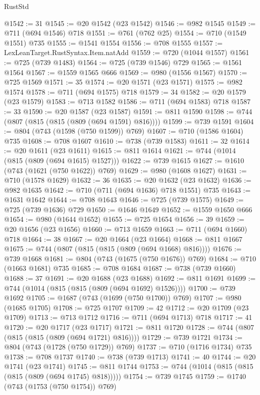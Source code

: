 \begin{lexlean}{RustStd}
\begin{coremodule}
@1542 := 31
@1545 := @20 @1542 (@23 @1542)
@1546 := @982 @1545
@1549 := @711 (@694 @1546) @718
@1551 := @761 (@762 @25)
@1554 := @710 (@1549 @1551) @735
@1555 := @1541 @1554
@1556 := @708 @1555
@1557 := LexLeanTarget.RustSyntax.Item.natAdd
@1559 := @720 (@1044 @1557)
@1561 := @725 (@739 @1483)
@1564 := @725 (@739 @1546) @729
@1565 := @1561 @1564
@1567 := @1559 @1565 @666
@1569 := @980 (@1556 @1567)
@1570 := @725 @1569
@1571 := 35
@1574 := @20 @1571 (@23 @1571)
@1575 := @982 @1574
@1578 := @711 (@694 @1575) @718
@1579 := 34
@1582 := @20 @1579 (@23 @1579)
@1583 := @713 @1582
@1586 := @711 (@694 @1583) @718
@1587 := 33
@1590 := @20 @1587 (@23 @1587)
@1591 := @811 @1590
@1598 := @744 (@807 (@815 (@815 (@809 (@694 @1591) @816))))
@1599 := @739 @1591
@1604 := @804 (@743 (@1598 (@750 @1599)) @769)
@1607 := @710 (@1586 @1604) @735
@1608 := @708 @1607
@1610 := @738 (@739 @1583)
@1611 := 32
@1614 := @20 @1611 (@23 @1611)
@1615 := @811 @1614
@1621 := @744 (@1014 (@815 (@809 (@694 @1615) @1527)))
@1622 := @739 @1615
@1627 := @1610 (@743 (@1621 (@750 @1622)) @769)
@1629 := @980 (@1608 @1627)
@1631 := @710 (@1578 @1629)
@1632 := 36
@1635 := @20 @1632 (@23 @1632)
@1636 := @982 @1635
@1642 := @710 (@711 (@694 @1636) @718 @1551) @735
@1643 := @1631 @1642
@1644 := @708 @1643
@1646 := @725 (@739 @1575)
@1649 := @725 (@739 @1636) @729
@1650 := @1646 @1649
@1652 := @1559 @1650 @666
@1654 := @980 (@1644 @1652)
@1655 := @725 @1654
@1656 := 39
@1659 := @20 @1656 (@23 @1656)
@1660 := @713 @1659
@1663 := @711 (@694 @1660) @718
@1664 := 38
@1667 := @20 @1664 (@23 @1664)
@1668 := @811 @1667
@1675 := @744 (@807 (@815 (@815 (@809 (@694 @1668) @816))))
@1676 := @739 @1668
@1681 := @804 (@743 (@1675 (@750 @1676)) @769)
@1684 := @710 (@1663 @1681) @735
@1685 := @708 @1684
@1687 := @738 (@739 @1660)
@1688 := 37
@1691 := @20 @1688 (@23 @1688)
@1692 := @811 @1691
@1699 := @744 (@1014 (@815 (@815 (@809 (@694 @1692) @1526))))
@1700 := @739 @1692
@1705 := @1687 (@743 (@1699 (@750 @1700)) @769)
@1707 := @980 (@1685 @1705)
@1708 := @725 @1707
@1709 := 42
@1712 := @20 @1709 (@23 @1709)
@1713 := @713 @1712
@1716 := @711 (@694 @1713) @718
@1717 := 41
@1720 := @20 @1717 (@23 @1717)
@1721 := @811 @1720
@1728 := @744 (@807 (@815 (@815 (@809 (@694 @1721) @816))))
@1729 := @739 @1721
@1734 := @804 (@743 (@1728 (@750 @1729)) @769)
@1737 := @710 (@1716 @1734) @735
@1738 := @708 @1737
@1740 := @738 (@739 @1713)
@1741 := 40
@1744 := @20 @1741 (@23 @1741)
@1745 := @811 @1744
@1753 := @744 (@1014 (@815 (@815 (@815 (@809 (@694 @1745) @818)))))
@1754 := @739 @1745
@1759 := @1740 (@743 (@1753 (@750 @1754)) @769)

\end{coremodule}
\end{lexlean}
